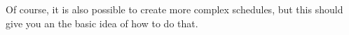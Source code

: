 \noindent
Of course, it is also possible to create more complex schedules, but this 
should give you an the basic idea of how to do that. 


\begin{comment}
\noindent
We can also do a simple proof to check that the results are as expected.

\hspace{-1cm}
\begin{tabular}{p{8cm} p{8cm}}
\begin{code}
	\Example \nm{test\_next\_weekday}:			\\ \-\ \quad
	  (next\_weekday (next\_weekday saturday)) 	\\ \-\ \qquad
	  	= tuesday.							\\
	\Proof.
\end{code}
&
\begin{msg}
1 subgoal			\\
\_\_\_\_\_\_\_\_\_\_\_\_\_\_\_\_\_\_\_\_\_\_\_\_\_\_\_\_\_\_\_\_\_\_\_\_\_\_(1/1)	\\
next\_weekday (next\_weekday saturday) = tuesday
\end{msg}
\end{tabular}
\end{comment}






